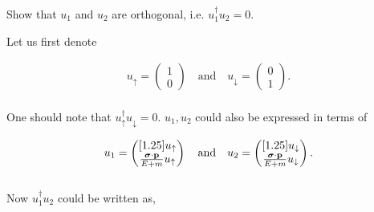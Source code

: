 \begin{problem}{4.2}
Show that $u_1$ and $u_2$ are orthogonal, i.e. $u_1^\dagger u_2 =0$.
\end{problem}
\begin{solution}
Let us first denote 

\begin{align*}
    u_\uparrow = \begin{pmatrix}
        1 \\
        0
    \end{pmatrix} \quad \text{and} \quad 
    u_\downarrow = \begin{pmatrix}
        0 \\
        1
    \end{pmatrix} .
\end{align*}\\
One should note that $u_\uparrow^{\dagger}u_\downarrow = 0$. $u_1,u_2$ could also be expressed in terms of 

\begin{align*}
    u_1 = \begin{pmatrix}[1.25]
        u_\uparrow \\
        \frac{\boldsymbol{\sigma}\cdot\mathbf{p}}{E+m} u_\uparrow
    \end{pmatrix} \quad \text{and} \quad 
    u_2 = \begin{pmatrix}[1.25]
        u_\downarrow \\
        \frac{\boldsymbol{\sigma}\cdot\mathbf{p}}{E+m} u_\downarrow
    \end{pmatrix}.
\end{align*}\\
Now $u_1^\dagger u_2$ could be written as, 


\end{solution}
